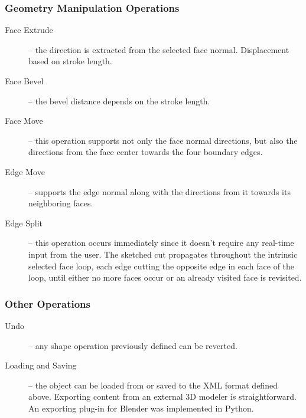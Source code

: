 \subsubsection{Geometry Manipulation Operations}

\begin{description}
	\item[Face Extrude] --
		the direction is extracted from the selected face normal. Displacement based on stroke length.
		
	\item[Face Bevel] --
		the bevel distance depends on the stroke length.
		
	\item[Face Move] --
		this operation supports not only the face normal directions,
		but also the directions from the face center towards the four boundary edges.
		
	\item[Edge Move] --
		supports the edge normal along with the directions from it towards its neighboring faces.
		
	\item[Edge Split] --
		this operation occurs immediately since it doesn't require any real-time input from the user.
		The sketched cut propagates throughout the intrinsic selected face loop, each edge cutting
		the opposite edge in each face of the loop, until either no more faces occur or an already
		visited face is revisited. 
\end{description}

\subsubsection{Other Operations}

\begin{description}
	\item[Undo] --
		any shape operation previously defined can be reverted.
		
	\item[Loading and Saving] --
		the object can be loaded from or saved to the XML format defined above.
		Exporting content from an external 3D modeler is straightforward.
		An exporting plug-in for Blender was implemented in Python.
\end{description}

